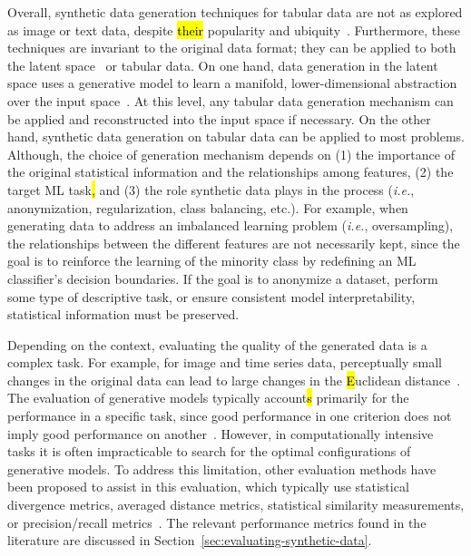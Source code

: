 Overall, synthetic data generation techniques for tabular data are not as
explored as image or text data, despite \hl{their} popularity and
ubiquity~\cite{fakoor2020fast}. Furthermore, these techniques are invariant to
the original data format; they can be applied to both the latent
space~\cite{devries2017dataset} or tabular data. On one hand, data generation
in the latent space uses a generative model to learn a manifold,
lower-dimensional abstraction over the input
space~\cite{kingma2019introduction}. At
this level, any tabular data generation mechanism can be applied and
reconstructed into the input space if necessary. On the other hand, synthetic
data generation on tabular data can be applied to most problems. Although, the
choice of generation mechanism depends on (1) the importance of the original
statistical information and the relationships among features, (2) the target
ML task\hl{,} and (3) the role synthetic data plays in the process (\textit{i.e.},
anonymization, regularization, class balancing, etc.).  For example, when
generating data to address an imbalanced learning problem (\textit{i.e.},
oversampling), the relationships between the different features are not
necessarily kept, since the goal is to reinforce the learning of the minority
class by redefining an ML classifier's decision boundaries. If the goal is to
anonymize a dataset, perform some type of descriptive task, or ensure
consistent model interpretability, statistical information must be preserved.

Depending on the context, evaluating the quality of the generated data is a
complex task. For example, for image and time series data, perceptually small
changes in the original data can lead to large changes in the \hl{E}uclidean
distance~\cite{assefa2020generating, theis2016note}. The evaluation of
generative models typically account\hl{s} primarily for the performance in a
specific task, since good performance in one criterion does not imply good
performance on another~\cite{theis2016note}. However, in computationally
intensive tasks it is often impracticable to search for the optimal
configurations of generative models. To address this limitation, other
evaluation methods have been proposed to assist in this evaluation, which
typically use statistical divergence metrics, averaged distance metrics,
statistical similarity measurements, or precision/recall
metrics~\cite{chundawat2022tabsyndex, alaa2022faithful}. The relevant
performance metrics found in the literature are discussed in
Section~\ref{sec:evaluating-synthetic-data}.

